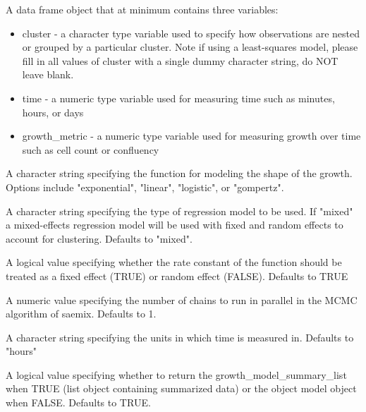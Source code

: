 \documentclass[a4paper]{book}
\begin{document}
\begin{Arguments}
\begin{ldescription}
\item[\code{data\_frame}] A data frame object that at minimum contains three
variables:
\begin{itemize}

\item{} cluster - a character type variable used to specify how observations
are nested or grouped by a particular cluster. Note if using a
least-squares model, please fill in all values of cluster with a single
dummy character string, do NOT leave blank.
\item{} time - a numeric type variable used for measuring time such as
minutes, hours, or days
\item{} growth\_metric - a numeric type variable used for measuring growth
over time such as cell count or confluency

\end{itemize}


\item[\code{function\_type}] A character string specifying the function for
modeling the shape of the growth. Options include "exponential", "linear",
"logistic", or "gompertz".

\item[\code{model\_type}] A character string specifying the type of regression
model to be used. If "mixed" a mixed-effects regression model will be used
with fixed and random effects to account for clustering. Defaults to "mixed".

\item[\code{fixed\_rate}] A logical value specifying whether the rate constant
of the function should be treated as a fixed effect (TRUE) or random
effect (FALSE). Defaults to TRUE

\item[\code{num\_chains}] A numeric value specifying the number of chains to run
in parallel in the MCMC algorithm of saemix. Defaults to 1.

\item[\code{time\_unit}] A character string specifying the units in which time is
measured in. Defaults to "hours"

\item[\code{return\_summary}] A logical value specifying whether to return the
growth\_model\_summary\_list when TRUE (list object containing summarized data)
or the object model object when FALSE. Defaults to TRUE.


\end{ldescription}
\end{Arguments}
\end{document}

